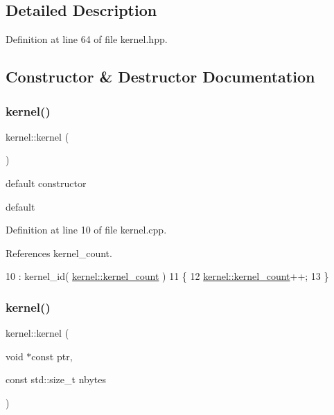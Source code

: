 \subsection{Detailed Description}


Definition at line 64 of file kernel.\+hpp.



\subsection{Constructor \& Destructor Documentation}
\hypertarget{classraft_1_1kernel_a57aa6c7842f594d1522fb1c127fc4588}{}\label{classraft_1_1kernel_a57aa6c7842f594d1522fb1c127fc4588} 
\subsubsection{\texorpdfstring{kernel()}{kernel()}\hspace{0.1cm}{\footnotesize\ttfamily [1/2]}}
{\footnotesize\ttfamily kernel\+::kernel (\begin{DoxyParamCaption}{ }\end{DoxyParamCaption})}

default constructor

default 

Definition at line 10 of file kernel.\+cpp.



References kernel\+\_\+count.


\begin{DoxyCode}
10                : kernel\_id( \hyperlink{classraft_1_1kernel_a98e05f7418c208e28b9112e92df7eccf}{kernel::kernel\_count} )
11 \{
12    \hyperlink{classraft_1_1kernel_a98e05f7418c208e28b9112e92df7eccf}{kernel::kernel\_count}++;
13 \}
\end{DoxyCode}
\hypertarget{classraft_1_1kernel_a8c275f04f04b99d77fc4639a053112c8}{}\label{classraft_1_1kernel_a8c275f04f04b99d77fc4639a053112c8} 
\subsubsection{\texorpdfstring{kernel()}{kernel()}\hspace{0.1cm}{\footnotesize\ttfamily [2/2]}}
{\footnotesize\ttfamily kernel\+::kernel (\begin{DoxyParamCaption}\item[{void $\ast$const}]{ptr,  }\item[{const std\+::size\+\_\+t}]{nbytes }\end{DoxyParamCaption})}

